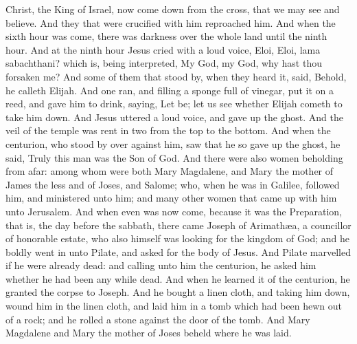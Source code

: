 Christ, the King of Israel, now come down from the cross, that we may see and believe. And they that were crucified with him reproached him.  And when the sixth hour was come, there was darkness over the whole land until the ninth hour. And at the ninth hour Jesus cried with a loud voice, Eloi, Eloi, lama sabachthani? which is, being interpreted, My God, my God, why hast thou forsaken me? And some of them that stood by, when they heard it, said, Behold, he calleth Elijah. And one ran, and filling a sponge full of vinegar, put it on a reed, and gave him to drink, saying, Let be; let us see whether Elijah cometh to take him down. And Jesus uttered a loud voice, and gave up the ghost. And the veil of the temple was rent in two from the top to the bottom. And when the centurion, who stood by over against him, saw that he so gave up the ghost, he said, Truly this man was the Son of God. And there were also women beholding from afar: among whom were both Mary Magdalene, and Mary the mother of James the less and of Joses, and Salome; who, when he was in Galilee, followed him, and ministered unto him; and many other women that came up with him unto Jerusalem.  And when even was now come, because it was the Preparation, that is, the day before the sabbath, there came Joseph of Arimathæa, a councillor of honorable estate, who also himself was looking for the kingdom of God; and he boldly went in unto Pilate, and asked for the body of Jesus. And Pilate marvelled if he were already dead: and calling unto him the centurion, he asked him whether he had been any while dead. And when he learned it of the centurion, he granted the corpse to Joseph. And he bought a linen cloth, and taking him down, wound him in the linen cloth, and laid him in a tomb which had been hewn out of a rock; and he rolled a stone against the door of the tomb. And Mary Magdalene and Mary the mother of Joses beheld where he was laid. 

